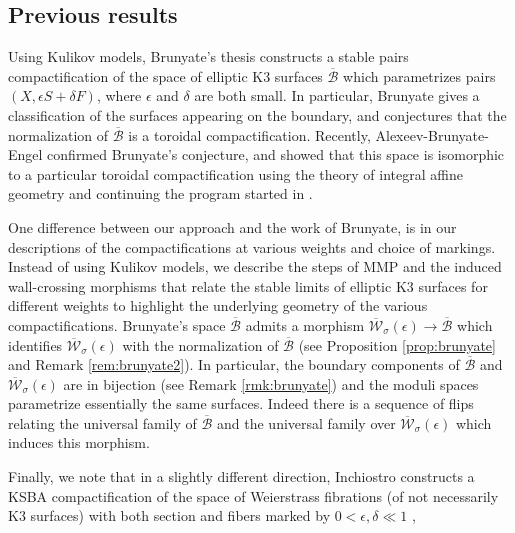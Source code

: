 \documentclass[11pt]{amsart}
\theoremstyle{definition}
\theoremstyle{remark}
\newcounter{step}
\newcommand{\kepsilon}{\overline{\mathcal{W}}_\sigma(\epsilon)}
\newcommand{\bru}{\overline{\mathscr{B}}}
\begin{document}
	\subsection{Previous results}\label{sec:brunyate}
	Using  Kulikov models, Brunyate's thesis \cite{brunyate} constructs a stable pairs compactification of the space of elliptic K3 surfaces $\bru$ which parametrizes pairs $(X, \epsilon S + \delta F)$, where $\epsilon$ and $\delta$ are both small. In particular, Brunyate gives a classification of the surfaces appearing on the boundary, and conjectures that the normalization of $\bru$ is a toroidal compactification.  Recently, Alexeev-Brunyate-Engel \cite{abe} confirmed Brunyate's conjecture, and showed that this space is isomorphic to a particular toroidal compactification using the theory of integral affine geometry and continuing the program started in \cite{aet}. 
	
	One difference between our approach and the work of Brunyate, is in our descriptions of the compactifications at various weights and choice of markings. Instead of using Kulikov models, we describe the steps of MMP and the induced wall-crossing morphisms that relate the stable limits of elliptic K3 surfaces for different weights to highlight the underlying geometry of the various compactifications. Brunyate's space $\bru$ admits a morphism $\overline{\mathcal{W}}_\sigma(\epsilon) \to \bru$ which identifies $\overline{\mathcal{W}}_\sigma(\epsilon)$ with the normalization of $\bru$ (see Proposition \ref{prop:brunyate} and Remark \ref{rem:brunyate2}). In particular, the boundary components of $\bru$ and $\kepsilon$ are in bijection (see Remark \ref{rmk:brunyate}) and the moduli spaces parametrize essentially the same surfaces. Indeed there is a sequence of flips relating the universal family of $\bru$ and the universal family over $\overline{\mathcal{W}}_\sigma(\epsilon)$ which induces this morphism. 
	
	Finally, we note that in a slightly different direction, Inchiostro constructs a KSBA compactification of the space of Weierstrass fibrations (of not necessarily K3 surfaces) with both section and fibers marked by $0 < \epsilon, \delta \ll 1$ \cite{giovanni}, 
	
	
	
\end{document}
